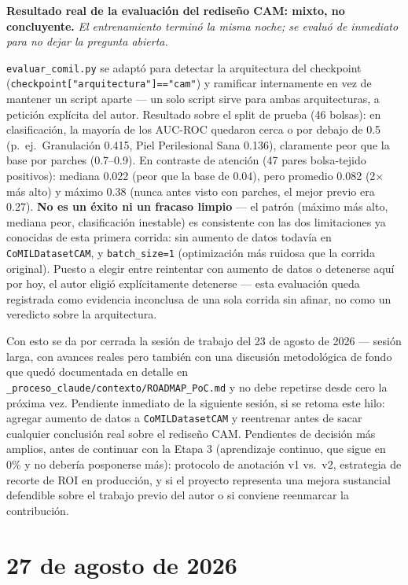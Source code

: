\documentclass[12pt,letterpaper]{report}
\newcommand{\entrada}[2]{%
    \vspace{0.6em}
    \noindent\textbf{#1.} \textit{#2}
    \vspace{0.3em}
    \par
}
\begin{document}
\entrada{Resultado real de la evaluación del rediseño CAM: mixto, no concluyente}{El entrenamiento
terminó la misma noche; se evaluó de inmediato para no dejar la pregunta abierta.}

\texttt{evaluar\_comil.py} se adaptó para detectar la arquitectura del checkpoint
(\texttt{checkpoint["arquitectura"]=="cam"}) y ramificar internamente en vez de mantener un script
aparte --- un solo script sirve para ambas arquitecturas, a petición explícita del autor. Resultado
sobre el split de prueba (46 bolsas): en clasificación, la mayoría de los AUC-ROC quedaron cerca o
por debajo de 0.5 (p.\ ej.\ Granulación 0.415, Piel Perilesional Sana 0.136), claramente peor que la
base por parches (0.7--0.9). En contraste de atención (47 pares bolsa-tejido positivos): mediana
0.022 (peor que la base de 0.04), pero promedio 0.082 (2$\times$ más alto) y máximo 0.38 (nunca antes
visto con parches, el mejor previo era 0.27). \textbf{No es un éxito ni un fracaso limpio} --- el
patrón (máximo más alto, mediana peor, clasificación inestable) es consistente con las dos
limitaciones ya conocidas de esta primera corrida: sin aumento de datos todavía en
\texttt{CoMILDatasetCAM}, y \texttt{batch\_size=1} (optimización más ruidosa que la corrida
original). Puesto a elegir entre reintentar con aumento de datos o detenerse aquí por hoy, el autor
eligió explícitamente detenerse --- esta evaluación queda registrada como evidencia inconclusa de una
sola corrida sin afinar, no como un veredicto sobre la arquitectura.

Con esto se da por cerrada la sesión de trabajo del 23 de agosto de 2026 --- sesión larga, con
avances reales pero también con una discusión metodológica de fondo que quedó documentada en detalle
en \texttt{\_proceso\_claude/contexto/ROADMAP\_PoC.md} y no debe repetirse desde cero la próxima vez.
Pendiente inmediato de la siguiente sesión, si se retoma este hilo: agregar aumento de datos a
\texttt{CoMILDatasetCAM} y reentrenar antes de sacar cualquier conclusión real sobre el rediseño CAM.
Pendientes de decisión más amplios, antes de continuar con la Etapa 3 (aprendizaje continuo, que
sigue en 0\% y no debería posponerse más): protocolo de anotación v1 vs.\ v2, estrategia de recorte
de ROI en producción, y si el proyecto representa una mejora sustancial defendible sobre el trabajo
previo del autor o si conviene reenmarcar la contribución.

\section{27 de agosto de 2026}
\end{document}
